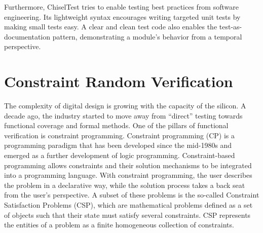 \documentclass[runningheads]{llncs}
\begin{document}
Furthermore, ChiselTest tries to enable testing best practices from software engineering.
Its lightweight syntax encourages writing targeted unit tests by making small tests easy.
A clear and clean test code also enables the test-as-documentation pattern,
demonstrating a module's behavior from a temporal perspective.


\section{Constraint Random Verification}
The complexity of digital design is growing with the capacity of the silicon. A decade ago, the industry started to move away from ``direct''
testing towards functional coverage and formal methods. One of the pillars of functional verification is constraint programming.
Constraint programming (CP) is a programming paradigm that has been developed since the mid-1980s and emerged as a further development of logic
programming. Constraint-based programming allows constraints and their solution mechanisms to be integrated into a programming language.
With constraint programming, the user describes the problem in a declarative way, while the solution process takes a back seat from the user's
perspective. A subset of these problems is the so-called Constraint Satisfaction Problems (CSP), which are mathematical problems defined as a
set of objects such that their state must satisfy several constraints. CSP represents the entities of a problem as a finite homogeneous
collection of constraints.
\end{document}
